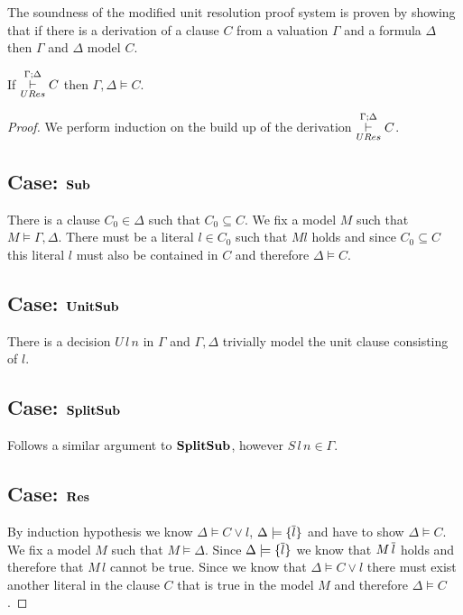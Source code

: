 The soundness of the modified unit resolution proof system is proven by showing that if there is a derivation of a clause $C$ from a valuation $\Gamma$ and a formula $\Delta$ then $\Gamma$ and $\Delta$ model $C$. \\
\medskip
\begin{mytheorem}\label{thm:UResSoundness}
If  $ \overset{\Gamma;\Delta}{\underset{URes}{\vdash}} C$ then $\Gamma, \Delta \models C$.
%
\begin{proof}
We perform induction on the build up of  the derivation $ \overset{\Gamma;\Delta}{\underset{URes}{\vdash}} C$.
\subsection*{Case: $\mathbf{Sub}$}
%
There is a clause $C_0 \in \Delta$ such that $C_0 \subseteq C$. We fix a model $M$ such that $M \models \Gamma, \Delta $. There must be a literal $l \in C_0$ such that $M l$ holds and since $C_0 \subseteq C$ this literal $l$ must also be contained in $C$ and therefore $\Delta \models C$.
%
\subsection*{Case: $\mathbf{UnitSub}$}
There is a decision $U \, l \, n$ in $\Gamma$ and $\Gamma,\Delta$ trivially model the unit clause consisting of $l$. 
%
\subsection*{Case: $\mathbf{SplitSub}$}
Follows a similar argument to $\mathbf{SplitSub}$, however $S \, l \, n \in \Gamma$.
\subsection*{Case: $\mathbf{Res}$}
By induction hypothesis we know $ \Delta \models C \vee l$, $ \Delta \models \{ \overline{l} \}$ and have to show $ \Delta \models C$. We fix a model $M$ such that $M \models \Delta$.  Since $ \Delta \models \{ \overline{l} \}$ we know that $M \, \overline{l}$ holds and therefore that $M \, l$ cannot be true. Since we know that $ \Delta \models C \vee l$ there must exist another literal in the clause $C$ that is true in the model $M$ and therefore $\Delta \models C$.
\end{proof}
\end{mytheorem} 

